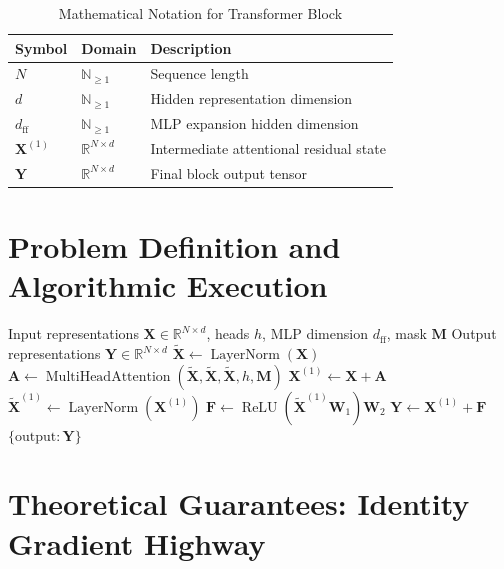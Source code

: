 \documentclass[11pt,a4paper]{article}
\theoremstyle{definition}
\begin{document}
\begin{table}[h]
\centering
\caption{Mathematical Notation for Transformer Block}
\begin{tabular}{lll}
\toprule
\textbf{Symbol} & \textbf{Domain} & \textbf{Description} \\
\midrule
$N$ & $\mathbb{N}_{\ge 1}$ & Sequence length \\
$d$ & $\mathbb{N}_{\ge 1}$ & Hidden representation dimension \\
$d_{\text{ff}}$ & $\mathbb{N}_{\ge 1}$ & MLP expansion hidden dimension \\
$\mathbf{X}^{(1)}$ & $\mathbb{R}^{N \times d}$ & Intermediate attentional residual state \\
$\mathbf{Y}$ & $\mathbb{R}^{N \times d}$ & Final block output tensor \\
\bottomrule
\end{tabular}
\end{table}

\section{Problem Definition and Algorithmic Execution}

\begin{algorithm}[H]
\caption{Pre-LN Transformer Block Forward Pass}
\label{alg:transformer_block}
\begin{algorithmic}[1]
\Require Input representations $\mathbf{X} \in \mathbb{R}^{N \times d}$, heads $h$, MLP dimension $d_{\text{ff}}$, mask $\mathbf{M}$
\Ensure Output representations $\mathbf{Y} \in \mathbb{R}^{N \times d}$
\State $\tilde{\mathbf{X}} \gets \operatorname{LayerNorm}(\mathbf{X})$
\State $\mathbf{A} \gets \operatorname{MultiHeadAttention}(\tilde{\mathbf{X}}, \tilde{\mathbf{X}}, \tilde{\mathbf{X}}, h, \mathbf{M})$
\State $\mathbf{X}^{(1)} \gets \mathbf{X} + \mathbf{A}$ 
\State $\tilde{\mathbf{X}}^{(1)} \gets \operatorname{LayerNorm}(\mathbf{X}^{(1)})$
\State $\mathbf{F} \gets \operatorname{ReLU}(\tilde{\mathbf{X}}^{(1)} \mathbf{W}_1) \mathbf{W}_2$
\State $\mathbf{Y} \gets \mathbf{X}^{(1)} + \mathbf{F}$ 
\State \Return $\{\text{output}: \mathbf{Y}\}$
\end{algorithmic}
\end{algorithm}

\section{Theoretical Guarantees: Identity Gradient Highway}
\end{document}
